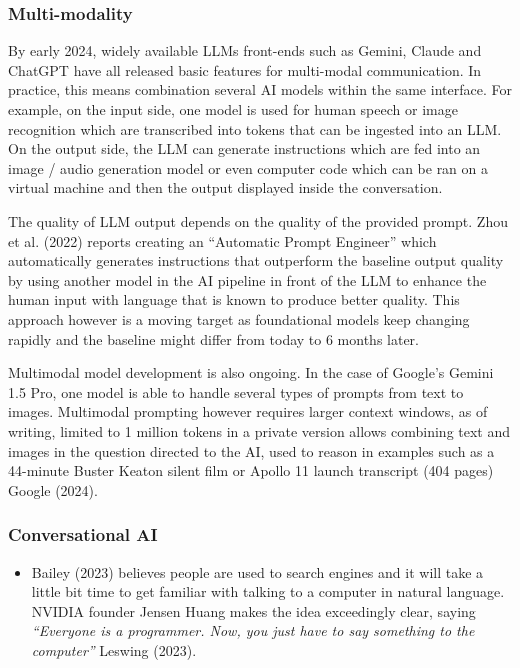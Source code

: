 \documentclass[
  letterpaper,
  DIV=11,
  numbers=noendperiod]{scrartcl}
\providecommand{\tightlist}{%
  \setlength{\itemsep}{0pt}\setlength{\parskip}{0pt}}\usepackage{longtable,booktabs,array}
\begin{document}
\subsubsection{Multi-modality}\label{multi-modality}

By early 2024, widely available LLMs front-ends such as Gemini, Claude
and ChatGPT have all released basic features for multi-modal
communication. In practice, this means combination several AI models
within the same interface. For example, on the input side, one model is
used for human speech or image recognition which are transcribed into
tokens that can be ingested into an LLM. On the output side, the LLM can
generate instructions which are fed into an image / audio generation
model or even computer code which can be ran on a virtual machine and
then the output displayed inside the conversation.

The quality of LLM output depends on the quality of the provided prompt.
Zhou et al. (2022) reports creating an ``Automatic Prompt Engineer''
which automatically generates instructions that outperform the baseline
output quality by using another model in the AI pipeline in front of the
LLM to enhance the human input with language that is known to produce
better quality. This approach however is a moving target as foundational
models keep changing rapidly and the baseline might differ from today to
6 months later.

Multimodal model development is also ongoing. In the case of Google's
Gemini 1.5 Pro, one model is able to handle several types of prompts
from text to images. Multimodal prompting however requires larger
context windows, as of writing, limited to 1 million tokens in a private
version allows combining text and images in the question directed to the
AI, used to reason in examples such as a 44-minute Buster Keaton silent
film or Apollo 11 launch transcript (404 pages) Google (2024).

\subsubsection{Conversational AI}\label{conversational-ai}

\begin{itemize}
\tightlist
\item
  Bailey (2023) believes people are used to search engines and it will
  take a little bit time to get familiar with talking to a computer in
  natural language. NVIDIA founder Jensen Huang makes the idea
  exceedingly clear, saying \emph{``Everyone is a programmer. Now, you
  just have to say something to the computer''} Leswing (2023).
\end{itemize}
\end{document}
